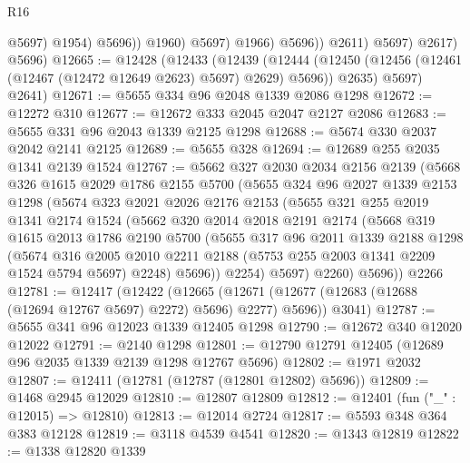 \begin{lexlean}{R16}
\begin{coremodule}
                              @5697)
                            @1954)
                          @5696))
                      @1960)
                    @5697)
                  @1966)
                @5696))
            @2611)
          @5697)
        @2617)
      @5696)
@12665 := @12428
    (@12433
      (@12439
        (@12444 (@12450 (@12456 (@12461 (@12467 (@12472 @12649 @2623) @5697) @2629) @5696)) @2635)
        @5697)
      @2641)
@12671 := @5655 @334 @96 @2048 @1339 @2086 @1298
@12672 := @12272 @310
@12677 := @12672 @333 @2045 @2047 @2127 @2086
@12683 := @5655 @331 @96 @2043 @1339 @2125 @1298
@12688 := @5674 @330 @2037 @2042 @2141 @2125
@12689 := @5655 @328
@12694 := @12689 @255 @2035 @1341 @2139 @1524
@12767 := @5662
    @327
    @2030
    @2034
    @2156
    @2139
    (@5668
      @326
      @1615
      @2029
      @1786
      @2155
      @5700
      (@5655
        @324
        @96
        @2027
        @1339
        @2153
        @1298
        (@5674
          @323
          @2021
          @2026
          @2176
          @2153
          (@5655
            @321
            @255
            @2019
            @1341
            @2174
            @1524
            (@5662
              @320
              @2014
              @2018
              @2191
              @2174
              (@5668
                @319
                @1615
                @2013
                @1786
                @2190
                @5700
                (@5655
                  @317
                  @96
                  @2011
                  @1339
                  @2188
                  @1298
                  (@5674
                    @316
                    @2005
                    @2010
                    @2211
                    @2188
                    (@5753 @255 @2003 @1341 @2209 @1524 @5794 @5697)
                    @2248)
                  @5696))
              @2254)
            @5697)
          @2260)
        @5696))
    @2266
@12781 := @12417
    (@12422
      (@12665 (@12671 (@12677 (@12683 (@12688 (@12694 @12767 @5697) @2272) @5696) @2277) @5696))
      @3041)
@12787 := @5655 @341 @96 @12023 @1339 @12405 @1298
@12790 := @12672 @340 @12020 @12022
@12791 := @2140 @1298
@12801 := @12790 @12791 @12405 (@12689 @96 @2035 @1339 @2139 @1298 @12767 @5696)
@12802 := @1971 @2032
@12807 := @12411 (@12781 (@12787 (@12801 @12802) @5696))
@12809 := @1468 @2945 @12029
@12810 := @12807 @12809
@12812 := @12401 (fun ("_" : @12015) => @12810)
@12813 := @12014 @2724
@12817 := @5593 @348 @364 @383 @12128
@12819 := @3118 @4539 @4541
@12820 := @1343 @12819
@12822 := @1338 @12820 @1339

\end{coremodule}
\end{lexlean}
